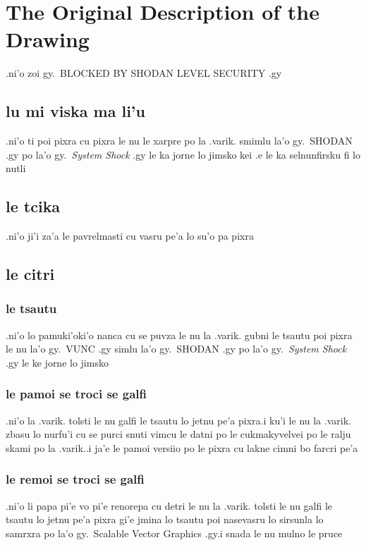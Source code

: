 \documentclass{report}
\begin{document}
\section{The Original Description of the Drawing}
.ni'o zoi gy.\ BLOCKED BY SHODAN LEVEL SECURITY .gy

\subsection{lu mi viska ma li'u}
.ni'o ti poi pixra cu pixra le nu le xarpre po la .varik. smimlu la'o gy.\ SHODAN .gy po la'o gy.\ \textit{System Shock} .gy le ka jorne lo jimsko kei .e le ka selnunfirsku fi lo nutli

\subsection{le tcika}
.ni'o ji'i za'a le pavrelmasti cu vasru pe'a lo su'o pa pixra

\subsection{le citri}
\subsubsection{le tsautu}
.ni'o lo pamuki'oki'o nanca cu se puvza le nu la .varik. gubni le tsautu poi pixra le nu la'o gy.\ VUNC .gy simlu la'o gy.\ SHODAN .gy po la'o gy.\ \textit{System Shock} .gy le ke jorne lo jimsko

\subsubsection{le pamoi se troci se galfi}
.ni'o la .varik. tolsti le nu galfi le tsautu lo jetnu pe'a pixra\@  .i ku'i le nu la .varik. zbasu lo nurfu'i cu se purci snuti vimcu le datni po le cukmakyvelvei po le ralju skami po la .varik.\@  .i ja'e le pamoi versiio po le pixra cu lakne cimni bo farcri pe'a

\subsubsection{le remoi se troci se galfi}
.ni'o li papa pi'e vo pi'e renorepa cu detri le nu la .varik. tolsti le nu galfi le tsautu lo jetnu pe'a pixra gi'e jmina lo tsautu poi nasevasru lo sirsunla lo samrxra po la'o gy.\ Scalable Vector Graphics .gy\@  .i snada le nu mulno le pruce
\end{document}
